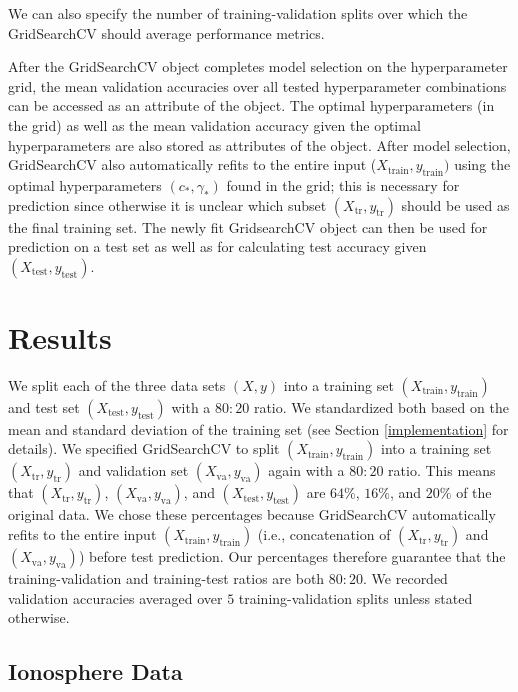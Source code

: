 \documentclass[12pt]{article}
\newcommand{\Xtrain}{X_{\mbox{train}}}
\newcommand{\ytrain}{y_{\mbox{train}}}
\newcommand{\Xtest}{X_{\mbox{test}}}
\newcommand{\ytest}{y_{\mbox{test}}}
\newcommand{\Xtr}{X_{\mbox{tr}}}
\newcommand{\ytr}{y_{\mbox{tr}}}
\newcommand{\Xva}{X_{\mbox{va}}}
\newcommand{\yva}{y_{\mbox{va}}}
\begin{document}
We can also specify the number of training-validation splits over which the GridSearchCV should average performance metrics.

After the GridSearchCV object completes model selection on the hyperparameter grid, the mean validation accuracies over all tested hyperparameter combinations can be accessed as an attribute of the object. The optimal hyperparameters (in the grid) as well as the mean validation accuracy given the optimal hyperparameters are also stored as attributes of the object. After model selection, GridSearchCV also automatically refits to the entire input ($\Xtrain, \ytrain)$ using the optimal hyperparameters $(c_*, \gamma_*)$ found in the grid; this is necessary for prediction since otherwise it is unclear which subset $(\Xtr, \ytr)$ should be used as the final training set. The newly fit GridsearchCV object can then be used for prediction on a test set as well as for calculating test accuracy given $(\Xtest, \ytest)$.


\section{Results}

We split each of the three data sets $(X, y)$ into a training set $(\Xtrain, \ytrain)$ and test set $(\Xtest, \ytest)$ with a $80:20$ ratio. We standardized both based on the mean and standard deviation of the training set (see Section \ref{implementation} for details). We specified GridSearchCV to split $(\Xtrain, \ytrain)$ into a training set $(\Xtr, \ytr)$ and validation set $(\Xva, \yva)$ again with a $80:20$ ratio. This means that $(\Xtr, \ytr)$, $(\Xva, \yva)$, and $(\Xtest, \ytest)$ are $64\%$, $16\%$, and $20\%$ of the original data. We chose these percentages because GridSearchCV automatically refits to the entire input $(\Xtrain, \ytrain)$ (i.e., concatenation of $(\Xtr, \ytr)$ and $(\Xva, \yva)$) before test prediction. Our percentages therefore guarantee that the training-validation and training-test ratios are both $80:20$. We recorded validation accuracies averaged over $5$ training-validation splits unless stated otherwise.

\subsection{Ionosphere Data}
\end{document}
